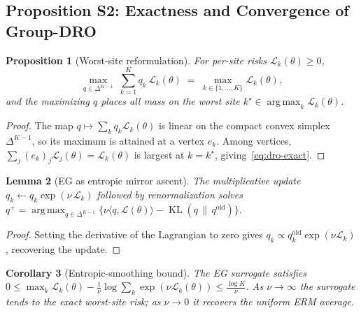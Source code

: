 \documentclass[runningheads]{llncs}
\DeclareMathOperator*{\argmax}{arg\,max}
\DeclareMathOperator{\KL}{KL}
\newtheorem{proposition}{Proposition}[section]
\newtheorem{lemma}[proposition]{Lemma}
\newtheorem{corollary}[proposition]{Corollary}
\begin{document}
\subsection{Proposition S2: Exactness and Convergence of Group-DRO}
\begin{proposition}[Worst-site reformulation]\label{prop:dro-exact}
For per-site risks $\mathcal{L}_k(\theta)\ge 0$,
\begin{equation}
\max_{q\in\Delta^{K-1}}\;\sum_{k=1}^{K} q_k\,\mathcal{L}_k(\theta) \;=\; \max_{k\in\{1,\dots,K\}} \mathcal{L}_k(\theta),
\label{eq:dro-exact}
\end{equation}
and the maximizing $q$ places all mass on the worst site $k^\star\in\argmax_k \mathcal{L}_k(\theta)$.
\end{proposition}
\begin{proof}
The map $q\mapsto\sum_k q_k\mathcal{L}_k(\theta)$ is linear on the compact convex simplex $\Delta^{K-1}$, so its maximum is attained at a vertex $e_k$. Among vertices, $\sum_j (e_k)_j\mathcal{L}_j(\theta)=\mathcal{L}_k(\theta)$ is largest at $k=k^\star$, giving~\eqref{eq:dro-exact}.
\end{proof}
\begin{lemma}[EG as entropic mirror ascent]\label{lem:eg}
The multiplicative update $q_k \leftarrow q_k\exp(\nu\,\mathcal{L}_k)$ followed by renormalization solves $q^{+} = \argmax_{q\in\Delta^{K-1}}\big\{\nu\langle q,\mathcal{L}(\theta)\rangle - \KL(q\,\|\,q^{\mathrm{old}})\big\}$.
\end{lemma}
\begin{proof}
Setting the derivative of the Lagrangian to zero gives $q_k\propto q^{\mathrm{old}}_k\exp(\nu\mathcal{L}_k)$, recovering the update.
\end{proof}
\begin{corollary}[Entropic-smoothing bound]\label{cor:eg-conv}
The EG surrogate satisfies $0 \le \max_k\mathcal{L}_k(\theta) - \frac{1}{\nu}\log\sum_k\exp(\nu\mathcal{L}_k(\theta)) \le \frac{\log K}{\nu}$. As $\nu\to\infty$ the surrogate tends to the exact worst-site risk; as $\nu\to 0$ it recovers the uniform ERM average.
\end{corollary}
\end{document}
